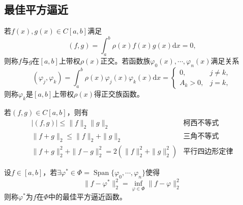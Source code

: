 \subsection{最佳平方逼近}
\begin{definition}[正交函数]
    若$f(x),g(x)\in C[a,b]$满足
    \[
        (f,g) = \int_{a}^{b}\rho(x)f(x)g(x)\mathrm{d} x = 0,
    \]
    则称$f$与$g$在$[a,b]$上带权$\rho(x)$正交。若函数族$
    \varphi_{0}(x),\cdots,\varphi_{n}(x)$满足关系
    \[
        (\varphi_j,\varphi_k)=\int_a^b\rho(x)\varphi_j(x)\varphi_k(x)\mathrm{d}x=
        \left\{
            \begin{array}{ll}
                0, & j\neq k,\\
                A_k>0, & j=k,
            \end{array}
        \right.
    \]
    则称${\varphi_k}$是$[a,b]$上带权$\rho(x)$得正交族函数。
\end{definition}
\begin{theorem}
    若$(f,g)\in C[a,b]$，则有
    \[
        \begin{array}{ll}
            |(f,g)|\leqslant\|f\|_2\|g\|_2 & \text{柯西不等式} \\
            \parallel f+g\parallel_2\leqslant\parallel f\parallel_2+\parallel g\parallel_2 & \text{三角不等式} \\
            \parallel f+g\parallel_2^2+\parallel f-g\parallel_2^2=2(\parallel f\parallel_2^2+\parallel g\parallel_2^2) & \text{平行四边形定律} 
        \end{array}
    \]
\end{theorem}
\begin{definition}[最佳平方逼近函数]
    设$f\in [a,b]$，若$\exists \varphi^*\in\Phi = \operatorname*{Span}\{\varphi_0,\cdots,\varphi_n  \}$使得
    \[
        \| f-\varphi^* \|_2^2 = \inf\limits_{\varphi\in\Phi}\| f-\varphi \|_2^2
    \]
    则称$\varphi^*$为$f$在$\Phi$中的最佳平方逼近函数。
\end{definition}
